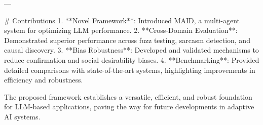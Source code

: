 ---

# Contributions  
1. **Novel Framework**: Introduced MAID, a multi-agent system for optimizing LLM performance.  
2. **Cross-Domain Evaluation**: Demonstrated superior performance across fuzz testing, sarcasm detection, and causal discovery.  
3. **Bias Robustness**: Developed and validated mechanisms to reduce confirmation and social desirability biases.  
4. **Benchmarking**: Provided detailed comparisons with state-of-the-art systems, highlighting improvements in efficiency and robustness.  

The proposed framework establishes a versatile, efficient, and robust foundation for LLM-based applications, paving the way for future developments in adaptive AI systems.